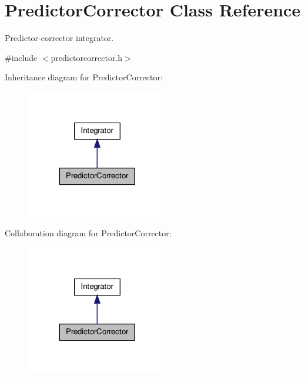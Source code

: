 \hypertarget{classPredictorCorrector}{\section{\-Predictor\-Corrector \-Class \-Reference}
\label{classPredictorCorrector}
}


\-Predictor-\/corrector integrator.  




{\ttfamily \#include $<$predictorcorrector.\-h$>$}



\-Inheritance diagram for \-Predictor\-Corrector\-:\nopagebreak
\begin{figure}[H]
\begin{center}
\leavevmode
\includegraphics[width=176pt]{classPredictorCorrector__inherit__graph}
\end{center}
\end{figure}


\-Collaboration diagram for \-Predictor\-Corrector\-:\nopagebreak
\begin{figure}[H]
\begin{center}
\leavevmode
\includegraphics[width=176pt]{classPredictorCorrector__coll__graph}
\end{center}
\end{figure}
